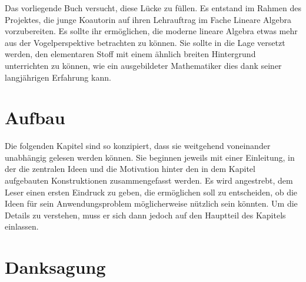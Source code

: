 Das vorliegende Buch versucht, diese Lücke zu füllen.
Es entstand im Rahmen des Projektes, die junge Koautorin auf ihren
Lehrauftrag im Fache Lineare Algebra vorzubereiten.
Es sollte ihr ermöglichen, die moderne lineare Algebra  etwas mehr
aus der Vogelperspektive betrachten zu können.
Sie sollte in die Lage versetzt werden, den elementaren Stoff mit
einem ähnlich breiten Hintergrund unterrichten zu können, wie ein
ausgebildeter Mathematiker dies dank seiner langjährigen Erfahrung
kann.

\section*{Aufbau}
Die folgenden Kapitel sind so konzipiert, dass sie weitgehend voneinander
unabhängig gelesen werden können.
Sie beginnen jeweils mit einer Einleitung, in der die zentralen Ideen
und die Motivation hinter den in dem Kapitel aufgebauten Konstruktionen
zusammengefasst werden.
Es wird angestrebt, dem Leser einen ersten Eindruck zu geben, die 
ermöglichen soll zu entscheiden, ob die Ideen für sein Anwendungsproblem
möglicherweise nützlich sein könnten.
Um die Details zu verstehen, muss er sich dann jedoch auf den
Hauptteil des Kapitels einlassen.

\section*{Danksagung}






